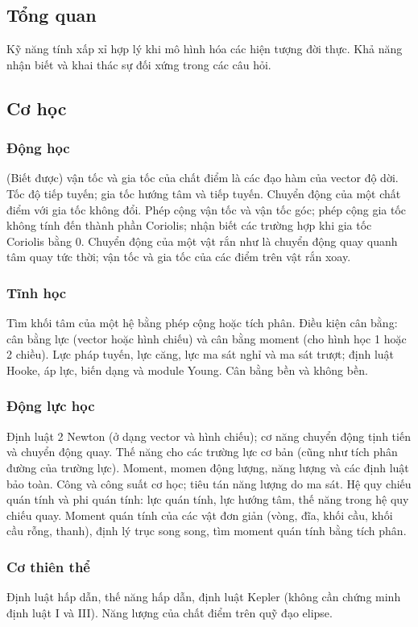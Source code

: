 \documentclass{article}
\begin{document}
\begin{multicols}{2}
\subsection{Tổng quan}
Kỹ năng tính xấp xỉ hợp lý khi mô hình hóa các hiện tượng đời thực. Khả năng nhận biết và khai thác sự đối xứng trong các câu hỏi.

\subsection{Cơ học}
\subsubsection{Động học}
(Biết được) vận tốc và gia tốc của chất điểm là các đạo hàm của vector độ dời. Tốc độ tiếp tuyến; gia tốc hướng tâm và tiếp tuyến. Chuyển động của một chất điểm với gia tốc không đổi. Phép cộng vận tốc và vận tốc góc; phép cộng gia tốc không tính đến thành phần Coriolis; nhận biết các trường hợp khi gia tốc Coriolis bằng 0. Chuyển động của một vật rắn như là chuyển động quay quanh tâm quay tức thời; vận tốc và gia tốc của các điểm trên vật rắn xoay.

\subsubsection{Tĩnh học}
Tìm khối tâm của một hệ bằng phép cộng hoặc tích phân. Điều kiện cân bằng: cân bằng lực (vector hoặc hình chiếu) và cân bằng moment (cho hình học 1 hoặc 2 chiều). Lực pháp tuyến, lực căng, lực ma sát nghỉ và ma sát trượt; định luật Hooke, áp lực, biến dạng và module Young. Cân bằng bền và không bền.

\subsubsection{Động lực học}
Định luật 2 Newton (ở dạng vector và hình chiếu); cơ năng chuyển động tịnh tiến và chuyển động quay. Thế năng cho các trường lực cơ bản (cũng như tích phân đường của trường lực). Moment, momen động lượng, năng lượng và các định luật bảo toàn. Công và công suất cơ học; tiêu tán năng lượng do ma sát. Hệ quy chiếu quán tính và phi quán tính: lực quán tính, lực hướng tâm, thế năng trong hệ quy chiếu quay. Moment quán tính của các vật đơn giản (vòng, đĩa, khối cầu, khối cầu rỗng, thanh), định lý trục song song, tìm moment quán tính bằng tích phân.

\subsubsection{Cơ thiên thể}
Định luật hấp dẫn, thế năng hấp dẫn, định luật Kepler (không cần chứng minh định luật I và III). Năng lượng của chất điểm trên quỹ đạo elipse.


\end{multicols}
\end{document}
